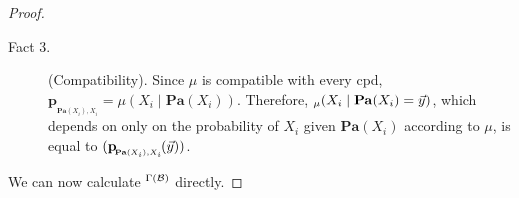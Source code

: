 \documentclass{article}
\theoremstyle{plain}
\theoremstyle{definition}
\theoremstyle{remark}
\let\H\relax
\DeclareMathOperator{\H}{\mathrm{H}} %
\newcommand\mat[1]{\mathbf{#1}}
\newcommand{\bp}[1][L]{\mat{p}_{\!_{#1}\!}}
\newcommand\Pa{\mathbf{Pa}}
\newcommand\PDGof{\Gamma}
\numberwithin{equation}{section}
\begin{document}
\begin{proof}
\begin{description}
			\item[Fact 3.] (Compatibility). Since $\mu$ is compatible with every cpd, $\bp[\Pa(X_i),X_i] = \mu(X_i \mid \Pa(X_i))$. Therefore, $\H_\mu(X_i \mid \Pa(X_i) = \vec y) $, which depends on only on the probability of $X_i$ given $\Pa(X_i)$ according to $\mu$, is equal to $\H(\bp[\Pa(X_i),X_i](\vec y))$. 
		\end{description}
		We can now calculate $\H^{\PDGof(\cal B)}$ directly.
		
		

\end{proof}
\end{document}
